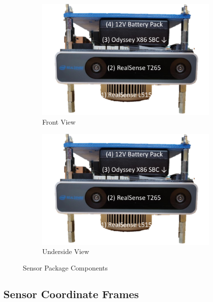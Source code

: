\begin{figure}[!htb]
  \centering
  \begin{subfigure}[t]{.40\linewidth}
    \centering\includegraphics[page=1,clip,trim=0cm 0cm 0cm 0cm,width=.99\linewidth]{chapter_7_experiments/imgs/sensor_package.pdf}
    \caption{\label{fig:ch7_sensor_package_a}Front View}
  \end{subfigure}
  \begin{subfigure}[t]{.40\linewidth}
    \centering\includegraphics[page=3,clip,trim=0cm 0cm 0cm 0cm,width=.99\linewidth]{chapter_7_experiments/imgs/sensor_package.pdf}
    \caption{\label{fig:ch7_sensor_package_b}Underside View}
  \end{subfigure}
  \caption[Sensor Package Components]{Sensor Package Components}\label{fig:ch7_sensor_package_pic}
\end{figure}

\subsection{Sensor Coordinate Frames}

